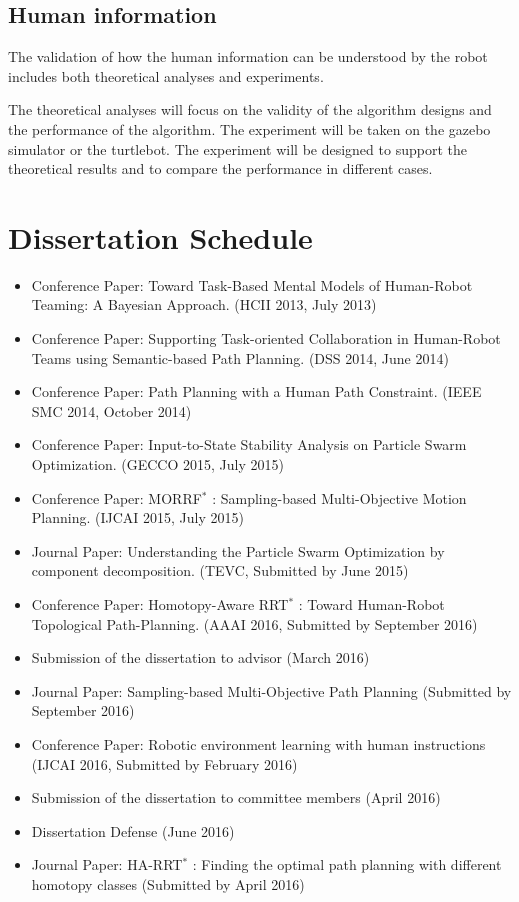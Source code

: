 \documentclass[phd]{byuprop}
\begin{document}
\subsection{Human information}

The validation of how the human information can be understood by the robot includes both theoretical analyses and experiments.

The theoretical analyses will focus on the validity of the algorithm designs and the performance of the algorithm.
The experiment will be taken on the gazebo simulator or the turtlebot.
The experiment will be designed to support the theoretical results and to compare the performance in different cases.


\section{Dissertation Schedule}

\begin{itemize}
\item Conference Paper: Toward Task-Based Mental Models of Human-Robot Teaming: A Bayesian Approach. (HCII 2013, July 2013)
\item Conference Paper: Supporting Task-oriented Collaboration in Human-Robot Teams using Semantic-based Path Planning. (DSS 2014, June 2014)
\item Conference Paper: Path Planning with a Human
Path Constraint. (IEEE SMC 2014, October 2014)
\item Conference Paper: Input-to-State Stability Analysis on Particle Swarm Optimization. (GECCO 2015, July 2015)
\item Conference Paper: MORRF$^{*}$ : Sampling-based Multi-Objective Motion Planning. (IJCAI 2015, July 2015)
\item Journal Paper: Understanding the Particle Swarm Optimization by component decomposition. (TEVC, Submitted by June 2015)
\item Conference Paper: Homotopy-Aware RRT$^{*}$ : Toward Human-Robot Topological Path-Planning. (AAAI 2016, Submitted by September 2016)
\item Submission of the dissertation to advisor (March 2016)
\item Journal Paper: Sampling-based Multi-Objective Path Planning (Submitted by September 2016)
\item Conference Paper: Robotic environment learning with human instructions (IJCAI 2016, Submitted by February 2016)
\item Submission of the dissertation to committee members (April 2016)
\item Dissertation Defense (June 2016)
\item Journal Paper: HA-RRT$^{*}$ : Finding the optimal path planning with different homotopy classes (Submitted by April 2016)
\end{itemize}



\end{document}
